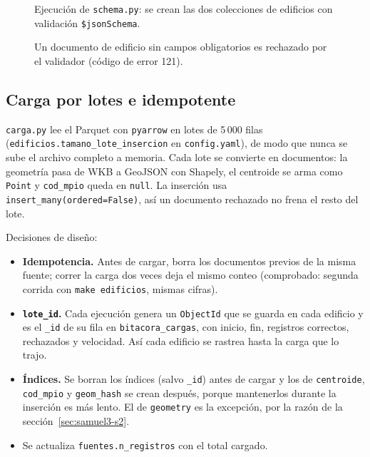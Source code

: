 \documentclass[11pt,a4paper]{article}
\newcommand{\campo}[1]{\texttt{#1}}
\begin{document}
\begin{figure}[H]
  \centering
  \caption{Ejecución de \campo{schema.py}: se crean las dos colecciones de
  edificios con validación \campo{\$jsonSchema}.}
  \label{fig:cap-schema-edif}
\end{figure}

\begin{figure}[H]
  \centering
  \caption{Un documento de edificio sin campos obligatorios es rechazado por
  el validador (código de error 121).}
  \label{fig:cap-validacion-edif}
\end{figure}

\subsection{Carga por lotes e idempotente}
\label{sec:samuel3-carga}

\campo{carga.py} lee el Parquet con \campo{pyarrow} en lotes de 5\,000 filas
(\campo{edificios.tamano\_lote\_insercion} en \campo{config.yaml}), de modo que
nunca se sube el archivo completo a memoria. Cada lote se convierte en
documentos: la geometría pasa de WKB a GeoJSON con Shapely, el centroide se
arma como \campo{Point} y \campo{cod\_mpio} queda en \campo{null}. La
inserción usa \campo{insert\_many(ordered=False)}, así un documento rechazado
no frena el resto del lote.

Decisiones de diseño:
\begin{itemize}
  \item \textbf{Idempotencia.} Antes de cargar, borra los documentos previos
        de la misma fuente; correr la carga dos veces deja el mismo conteo
        (comprobado: segunda corrida con \campo{make edificios}, mismas
        cifras).
  \item \textbf{\campo{lote\_id}.} Cada ejecución genera un \campo{ObjectId}
        que se guarda en cada edificio y es el \campo{\_id} de su fila en
        \campo{bitacora\_cargas}, con inicio, fin, registros correctos,
        rechazados y velocidad. Así cada edificio se rastrea hasta la carga
        que lo trajo.
  \item \textbf{Índices.} Se borran los índices (salvo \campo{\_id}) antes de
        cargar y los de \campo{centroide}, \campo{cod\_mpio} y
        \campo{geom\_hash} se crean después, porque mantenerlos durante la
        inserción es más lento. El de \campo{geometry} es la excepción, por
        la razón de la sección~\ref{sec:samuel3-s2}.
  \item Se actualiza \campo{fuentes.n\_registros} con el total cargado.
\end{itemize}
\end{document}
